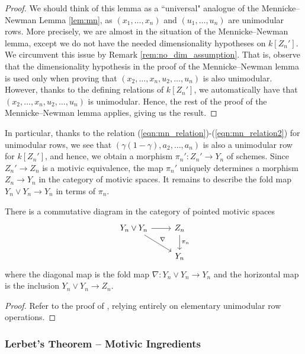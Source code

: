 \begin{proof}
    We should think of this lemma as a ``universal" analogue of the Mennicke--Newman Lemma \ref{lem:mn}, as $(x_1,\ldots,x_n)$ and $(u_1,\ldots,u_n)$ are unimodular rows. More precisely, we are almost in the situation of the Mennicke--Newman lemma, except we do not have the needed dimensionality hypotheses on $k[Z_n']$. We circumvent this issue by Remark \ref{rem:no_dim_assumption}. That is, observe that the dimensionality hypothesis in the proof of the Mennicke--Newman lemma is used only when proving that $(x_2,\ldots,x_n,u_2,\ldots,u_n)$ is also unimodular. However, thanks to the defining relations of $k[Z_n']$, we automatically have that $(x_2,\ldots,x_n,u_2,\ldots,u_n)$ is unimodular. Hence, the rest of the proof of the Mennicke--Newman lemma applies, giving us the result.
\end{proof}

In particular, thanks to the relation (\ref{eqn:mn_relation})-(\ref{eqn:mn_relation2}) for unimodular rows, we see that $(\gamma(1-\gamma),a_2,\ldots,a_n)$ is also a unimodular row for $k[Z_n']$, and hence, we obtain a morphism $\pi_n': Z_n' \to Y_n$ of schemes. Since $Z_n' \to Z_n$ is a motivic equivalence, the map $\pi_n'$ uniquely determines a morphism $Z_n \to Y_n$ in the category of motivic spaces. It remains to describe the fold map $Y_n \vee Y_n \to Y_n$ in terms of $\pi_n$. 

\begin{proposition}\cite[Lemma 5.8]{Lerbet}\label{prop:big_upshot}
    There is a commutative diagram in the category of pointed motivic spaces
\[\begin{tikzcd}
	{Y_n \vee Y_n} & {Z_n} \\
	& {Y_n}
	\arrow[from=1-1, to=1-2]
	\arrow[from=1-1, to=2-2, "{\nabla}"]
	\arrow["{\pi_n}", from=1-2, to=2-2]
\end{tikzcd}\]
where the diagonal map is the fold map $\nabla: Y_n \vee Y_n \to Y_n$ and the horizontal map is the inclusion $Y_n \vee Y_n \to Z_n$.
\end{proposition}

\begin{proof}
    Refer to the proof of \cite[Lemma 5.8]{Lerbet}, relying entirely on elementary unimodular row operations.
\end{proof} 

\subsubsection{Lerbet's Theorem -- Motivic Ingredients}\label{subsec:lerbet_motivic}

